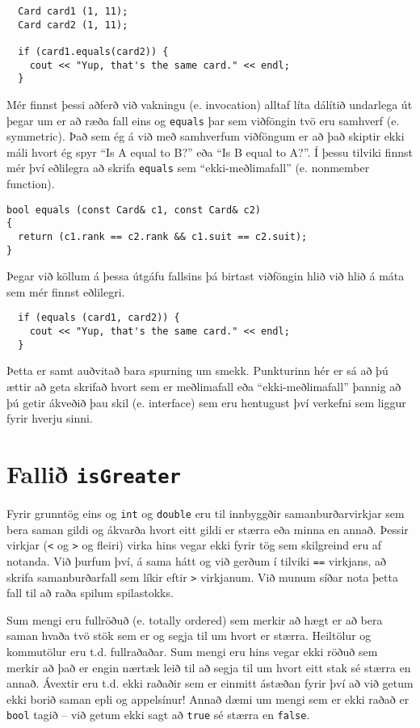 \begin{verbatim}
  Card card1 (1, 11);
  Card card2 (1, 11);

  if (card1.equals(card2)) {
    cout << "Yup, that's the same card." << endl;
  }
\end{verbatim}
%
Mér finnst þessi aðferð við vakningu (e. invocation) alltaf líta dálítið undarlega út
þegar um er að ræða fall eins og {\tt equals} þar sem viðföngin tvö eru samhverf (e. symmetric).
Það sem ég á við með samhverfum viðföngum er að það skiptir ekki máli hvort ég spyr 
``Is A equal to B?'' eða ``Is B equal to A?''.
Í þessu tilviki finnst mér því eðlilegra að skrifa {\tt equals} sem ``ekki-meðlimafall'' (e. nonmember function). 

\begin{verbatim}
bool equals (const Card& c1, const Card& c2)
{
  return (c1.rank == c2.rank && c1.suit == c2.suit);
}
\end{verbatim}
%
Þegar við köllum á þessa útgáfu fallsins þá birtast viðföngin hlið við hlið á máta sem mér finnst eðlilegri.

\begin{verbatim}
  if (equals (card1, card2)) {
    cout << "Yup, that's the same card." << endl;
  }
\end{verbatim}
%
Þetta er samt auðvitað bara spurning um smekk.
Punkturinn hér er sá að þú ættir að geta skrifað hvort sem er meðlimafall eða ``ekki-meðlimafall'' þannig að þú getir ákveðið þau skil (e. interface)
sem eru hentugust því verkefni sem liggur fyrir hverju sinni.

\section{Fallið {\tt isGreater}}

Fyrir grunntög eins og {\tt int} og {\tt double} eru til innbyggðir samanburðarvirkjar
sem bera saman gildi og ákvarða hvort eitt gildi er stærra eða minna en annað.
Þessir virkjar ({\tt <} og {\tt >} og fleiri) virka hins vegar ekki fyrir tög sem skilgreind eru af notanda.
Við þurfum því, á sama hátt og við gerðum í tilviki {\tt ==} virkjans, að skrifa samanburðarfall sem líkir eftir {\tt >} virkjanum.
Við munum síðar nota þetta fall til að raða spilum spilastokks.


Sum mengi eru fullröðuð (e. totally ordered) sem merkir að hægt er að bera saman hvaða tvö stök sem er og segja til um hvort er stærra.
Heiltölur og kommutölur eru t.d. fullraðaðar.
Sum mengi eru hins vegar ekki röðuð sem merkir að það er engin nærtæk leið til að segja til um hvort eitt stak sé stærra en annað.
Ávextir eru t.d. ekki raðaðir sem er einmitt ástæðan fyrir því að við getum ekki borið saman epli og appelsínur!
Annað dæmi um mengi sem er ekki raðað er {\tt bool} tagið -- við getum ekki sagt að {\tt true} sé stærra en {\tt false}.

